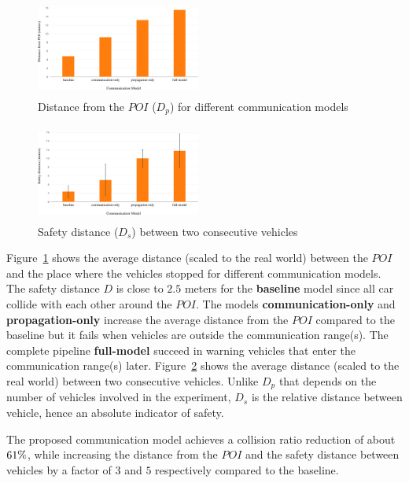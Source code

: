 \begin{figure}[t]
    \centering
    \includegraphics[width=0.48\textwidth, height=120px]{figures/distance_from_POI.pdf}
    \caption{Distance from the $POI$ ($D_p$) for different communication models \label{fig:distance_from_poi}}
\end{figure}

\begin{figure}[t]
    \centering
    \includegraphics[width=0.48\textwidth, height=120px]{figures/safety_distance.pdf}
    \caption{Safety distance ($D_s$) between two consecutive vehicles \label{fig:safety_distance}}
\end{figure}

Figure~\ref{fig:distance_from_poi} shows the average distance (scaled to the real world) between the $POI$ 
and the place where the vehicles stopped for different communication models. The safety distance $D$
is close to $2.5$ meters for the \textbf{baseline} model since all car collide with each other around the
$POI$. The models \textbf{communication-only} and \textbf{propagation-only} increase the average distance 
from the $POI$ compared to the baseline but it fails when vehicles are outside the communication range(s).
The complete pipeline \textbf{full-model} succeed in warning vehicles that enter the communication range(s)
later.
Figure~\ref{fig:safety_distance} shows the average distance (scaled to the real world) between two consecutive 
vehicles. Unlike $D_p$ that depends on the number of vehicles involved in the experiment, $D_s$ is the relative
distance between vehicle, hence an absolute indicator of safety.

The proposed communication model achieves a collision ratio reduction of about $\collision_ratio_reduction_perc\%$,
while increasing the distance from the $POI$ and the safety distance between vehicles by a factor of 
$3$ and $5$ respectively compared to the baseline.
